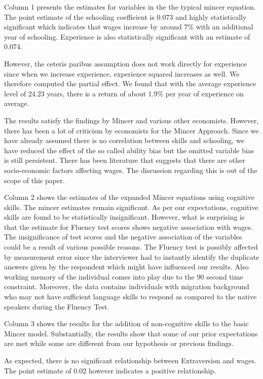 \documentclass[11pt, a4paper, leqno]{article}
\begin{document}
Column 1 presents the estimates for variables in the the typical mincer equation. The point estimate of the schooling coefficient is 0.073 and highly statistically significant  which indicates that wages increase by around 7\% with an additional year of schooling. Experience is also statistically significant with an estimate of 0.074. \par
However, the ceteris paribus assumption does not work directly for experience since when we increase experience, experience squared increases as well. We therefore computed the partial effect. We found that with the average experience level of 24.23 years, there is a return of about 1.9\% per year of experience on average.\par
The results satisfy the findings by Mincer and various other economists. However, there has been a lot of criticism by economists for the Mincer Approach. Since we have already assumed there is no  correlation between skills and schooling, we have reduced the effect of the so called ability bias but the omitted variable bias is still persistent. There has been literature that suggests that there are other socio-economic factors affecting wages. The discussion regarding this is out of the scope of this paper. \par
Column 2 shows the estimates of the expanded Mincer equations using cognitive skills. The mincer estimates remain significant. As per our expectations, cognitive skills are found to be statistically insignificant. However, what is surprising is that the estimate for Fluency test scores shows negative association with wages. 
The insignificance of  test scores  and the negative association of the variables could be a result of various possible reasons. The Fluency test is possibly affected by measurement error since the interviewer had to instantly identify the duplicate answers given by the respondent which might have influenced our results. Also working memory of the individual comes into play due to the 90 second time constraint. Moreover, the data contains individuals with migration background who may not have sufficient language skills to respond as compared to the native speakers during the Fluency Test. \par
Column 3 shows the results for the addition of non-cognitive skills to the basic Mincer model. Substantially, the results show that some of our prior expectations are met while some are different from our hypothesis or previous findings.\par
As expected, there is no significant relationship between Extraversion and wages. The point estimate of 0.02 however indicates a positive relationship. 
\end{document}
